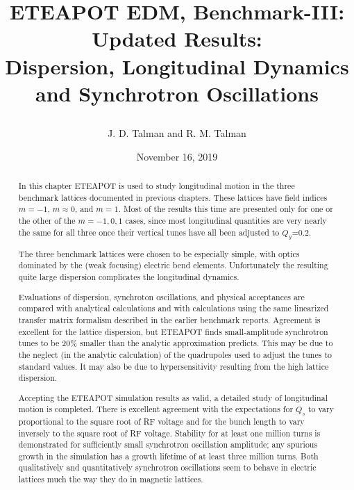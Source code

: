 \documentclass[]{article}
\begin{document}
\date{November 16, 2019}

\title{
\centerline{}
\centerline{}
\centerline{}
ETEAPOT EDM, Benchmark-III: Updated Results: \\ 
Dispersion, Longitudinal Dynamics and Synchrotron Oscillations \\
}
\author{J. D. Talman and R. M. Talman
}

\maketitle

%
\begin{abstract}
In this chapter ETEAPOT is used to study longitudinal motion in 
the three benchmark lattices documented in previous chapters.
These lattices have field indices $m=-1$, $m\approx0$, and $m=1$.  Most of the results 
this time are presented only for one or the other of the $m=-1,0,1$ cases, since most 
longitudinal quantities are very nearly the same for all three once their 
vertical tunes have all been adjusted to $Q_y$=0.2.

The three benchmark lattices were chosen to be 
especially simple, with optics dominated by the (weak focusing) electric
bend elements. Unfortunately the resulting quite large dispersion 
complicates the longitudinal dynamics.

Evaluations of dispersion, synchroton oscillations, and physical acceptances
are compared with analytical calculations and with calculations using the same
linearized transfer matrix formalism described in the earlier 
benchmark reports\cite{BenchmarkI}\cite{BenchmarkII}.
Agreement is excellent for the lattice dispersion, but ETEAPOT 
finds small-amplitude synchrotron tunes to be 20\% smaller than the analytic
approximation predicts. This may be due to the neglect (in the analytic calculation)
of the quadrupoles used to adjust the tunes to standard values.  It may
also be due to hypersensitivity resulting from the high lattice dispersion.

Accepting the ETEAPOT simulation results as valid, a detailed study of longitudinal
motion is completed. There is excellent agreement with the expectations for $Q_s$ to 
vary proportional to the square root of RF voltage and for the bunch length to vary 
inversely to the square root of RF voltage.
Stability for at least one million turns is demonstrated for 
sufficiently small synchrotron oscillation amplitude; any spurious growth 
in the simulation has a growth lifetime of at least three million turns.
Both qualitatively and quantitatively synchrotron oscillations seem to behave
in electric lattices much the way they do in magnetic lattices.
\end{abstract}
%
\end{document}
